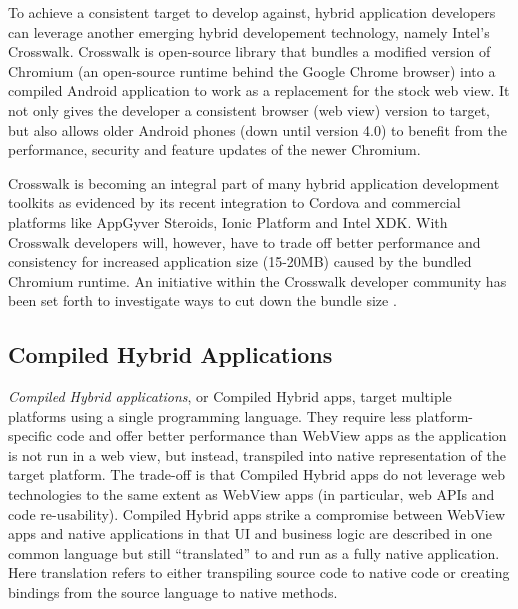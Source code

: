 \documentclass[thesis.tex]{subfiles}
\begin{document}
To achieve a consistent target to develop against, hybrid application developers can leverage another emerging hybrid developement technology, namely Intel's Crosswalk. Crosswalk is open-source library that bundles a modified version of Chromium (an open-source runtime behind the Google Chrome browser) into a compiled Android application to work as a replacement for the stock web view. It not only gives the developer a consistent browser (web view) version to target, but also allows older Android phones (down until version 4.0) to benefit from the performance, security and feature updates of the newer Chromium.

Crosswalk is becoming an integral part of many hybrid application development toolkits as evidenced by its recent integration to Cordova and commercial platforms like AppGyver Steroids, Ionic Platform and Intel XDK. With Crosswalk developers will, however, have to trade off better performance and consistency for increased application size (15-20MB) caused by the bundled Chromium runtime. An initiative within the Crosswalk developer community has been set forth to investigate ways to cut down the bundle size \cite{crosswalk_lite}.

\subsection{Compiled Hybrid Applications}

\textit{Compiled Hybrid applications}, or Compiled Hybrid apps, target multiple platforms using a single programming language. They require less platform-specific code and offer better performance than WebView apps as the application is not run in a web view, but instead, transpiled into native representation of the target platform. The trade-off is that Compiled Hybrid apps do not leverage web technologies to the same extent as WebView apps (in particular, web APIs and code re-usability). Compiled Hybrid apps strike a compromise between WebView apps and native applications in that UI and business logic are described in one common language but still ``translated'' to and run as a fully native application. Here translation refers to either transpiling source code to native code or creating bindings from the source language to native methods.
\end{document}
